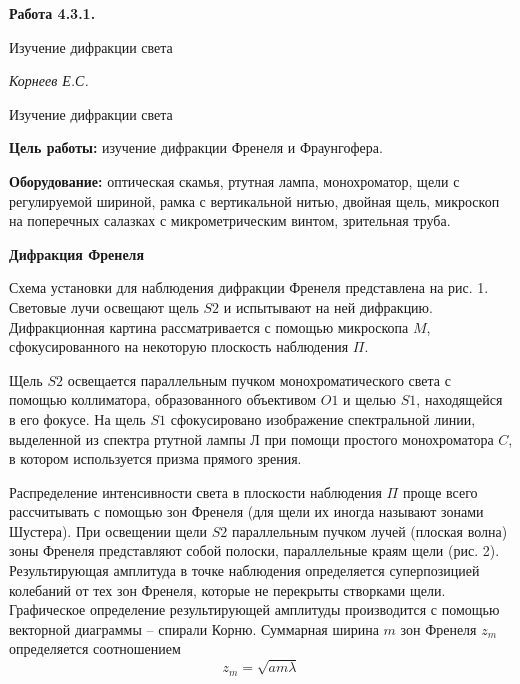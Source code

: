 \documentclass[14pt]{article}
\begin{document}
\begin{titlepage}
	\begin{center}
		\fontsize{18pt}{20pt}\selectfont
		\textbf{Работа 4.3.1.}	
	
		\vspace{5cm}
		\fontsize{24pt}{25pt}\selectfont
		Изучение дифракции света
	\end{center}
	\begin{flushright}
		\fontsize{18pt}{20pt}\selectfont
		\vspace{14cm}
		\hspace{-3cm}
		\textit{Корнеев Е.С.}
	\end{flushright}		
\end{titlepage}

\begin{center}
	\fontsize{16pt}{18pt}\selectfont	
	Изучение дифракции света
\end{center}


\fontsize{14pt}{16pt}\selectfont
\vspace{1cm}
\textbf{Цель работы:} изучение дифракции Френеля и Фраунгофера.

\vspace{0.5cm}
\textbf{Оборудование:} оптическая скамья, ртутная лампа, монохроматор, щели с регулируемой шириной, рамка с вертикальной нитью, двойная щель, микроскоп на поперечных салазках с микрометрическим винтом, зрительная труба.

\vspace{1cm}
\textbf{Дифракция Френеля}

Схема установки для наблюдения дифракции Френеля представлена на рис. 1. Световые лучи освещают щель $S2$ и испытывают на ней дифракцию. Дифракционная картина рассматривается с помощью микроскопа $M$, сфокусированного на некоторую плоскость наблюдения $\Pi$.

Щель $S2$ освещается параллельным пучком монохроматического света с помощью коллиматора, образованного объективом $O1$ и щелью $S1$, находящейся в его фокусе. На щель $S1$ сфокусировано изображение спектральной линии, выделенной из спектра ртутной лампы $Л$ при помощи простого монохроматора $C$, в котором используется призма прямого зрения. 

Распределение интенсивности света в плоскости наблюдения $\Pi$ проще всего рассчитывать с помощью зон Френеля (для щели их иногда называют зонами Шустера). При освещении щели $S2$ параллельным пучком лучей (плоская волна) зоны Френеля представляют собой полоски, параллельные краям щели (рис. 2). Результирующая амплитуда в точке наблюдения определяется суперпозицией колебаний от тех зон Френеля, которые не перекрыты створками щели. Графическое определение результирующей амплитуды производится с помощью векторной диаграммы -- спирали Корню. Суммарная ширина $m$ зон Френеля $z_m$ определяется соотношением
$$
	z_m = \sqrt{am\lambda}
$$
\end{document}
